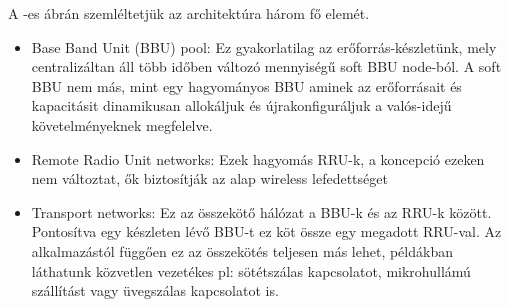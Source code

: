 A -es ábrán szemléltetjük az architektúra három fő elemét.
\begin{itemize}
\item Base Band Unit (BBU) pool: Ez gyakorlatilag az erőforrás-készletünk, mely centralizáltan áll több időben változó mennyiségű soft BBU node-ból. A soft BBU nem más, mint egy hagyományos BBU aminek az erőforrásait és kapacitásit dinamikusan allokáljuk és újrakonfiguráljuk a valós-idejű követelményeknek megfelelve.
\item Remote Radio Unit networks: Ezek hagyomás RRU-k, a koncepció ezeken nem változtat, ők biztosítják az alap wireless lefedettséget
\item Transport networks: Ez az összekötő hálózat a BBU-k és az RRU-k között. Pontosítva egy készleten lévő BBU-t ez köt össze egy megadott RRU-val. Az alkalmazástól függően ez az összekötés teljesen más lehet, példákban láthatunk közvetlen vezetékes pl: sötétszálas kapcsolatot, mikrohullámú szállítást vagy üvegszálas kapcsolatot is.
\end{itemize}

